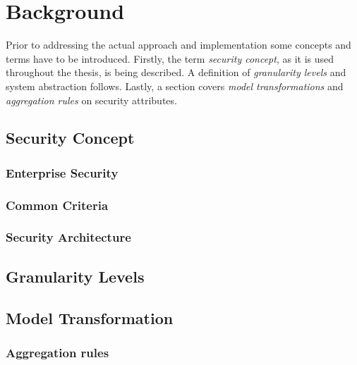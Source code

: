 \newpage
\section{Background}

Prior to addressing the actual approach and implementation some concepts and terms have to be introduced. Firstly, the term \textit{security concept}, as it is used throughout the thesis, is being described. A definition of \textit{granularity levels} and system abstraction follows. Lastly, a section covers \textit{model transformations} and \textit{aggregation rules} on security attributes.

\subsection{Security Concept}
\subsubsection{Enterprise Security}
\subsubsection{Common Criteria}
\subsubsection{Security Architecture}   

\subsection{Granularity Levels}

\subsection{Model Transformation}
\subsubsection{Aggregation rules}
